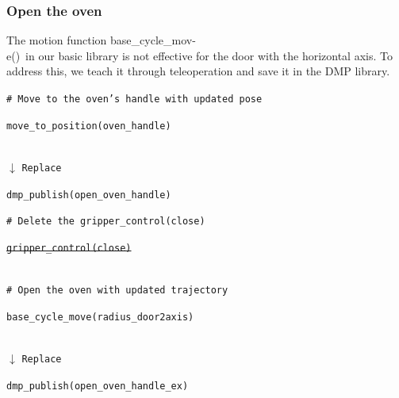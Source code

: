 \documentclass[letterpaper,conference]{ieeeconf}
\begin{document}
\subsubsection{Open the oven}
The motion function \textquotesingle base\_cycle\_mov-\\e()\textquotesingle\ in our basic library is not effective for the door with the horizontal axis. To address this, we teach it through teleoperation and save it in the DMP library. 
\begin{codebox}
\textcolor{codegreen}{\footnotesize \texttt{\# Move to the oven's handle with updated pose}}\\
\colorbox{codeblue}{%
    \begin{minipage}{\dimexpr\textwidth-6pt\relax}
       \footnotesize  \texttt{move\_to\_position(oven\_handle)}
    \end{minipage}%
}\\
\hspace*{2cm}$\downarrow$ \texttt{Replace}\\
\colorbox{dmpcolor}{%
    \begin{minipage}{\dimexpr\textwidth-6pt\relax}
        \footnotesize \texttt{dmp\_publish(open\_oven\_handle)}
    \end{minipage}%
}
\textcolor{codegreen}{\footnotesize \texttt{\# Delete the gripper\_control(close)}}\\
\colorbox{codeblue}{%
    \begin{minipage}{\dimexpr\textwidth-6pt\relax}
        \sout{\footnotesize \texttt{gripper\_control(close)}}
    \end{minipage}%
}\\
\textcolor{codegreen}{\footnotesize \texttt{\# Open the oven with updated trajectory}}\\
\colorbox{codeblue}{%
    \begin{minipage}{\dimexpr\textwidth-6pt\relax}
        \footnotesize \texttt{base\_cycle\_move(radius\_door2axis)}
    \end{minipage}%
}\\
\hspace*{2cm}$\downarrow$ \texttt{Replace}\\
\colorbox{dmpcolor}{%
    \begin{minipage}{\dimexpr\textwidth-6pt\relax}
        \footnotesize \texttt{dmp\_publish(open\_oven\_handle\_ex)}
    \end{minipage}%
}
\end{codebox}
\vspace{-1.5mm}
\end{document}

